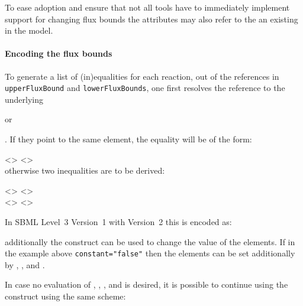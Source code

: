\begin{newsection}
\begin{deprecated}
{
To ease adoption and ensure that not all tools have to immediately implement
support for changing flux bounds the attributes may also refer to the an existing
\FluxBound in the model.
}
\end{deprecated}

\paragraph{Encoding the flux bounds}
To generate a list of (in)equalities for each reaction, out of the references
in \texttt{upperFluxBound} and \texttt{lowerFluxBounds}, one first resolves the
reference to the underlying \Parameter
\begin{deprecated}
or \FluxBound
\end{deprecated}. If they point to the same element, the equality will be of the form:

<> \token{=} <>\\

otherwise two inequalities are to be derived:

<> \token{>=} <>\\
<> \token{<=} <>

In SBML Level~3 Version~1 with \FBC Version~2 this is encoded as:
%

additionally the \InitialAssignment construct can be used to change the value of the
\Parameter elements. If in the example above \texttt{constant="false"} then the elements
can be set additionally by  \EventAssignment, \AssignmentRule, and \AlgebraicRule.


\begin{deprecated}

In case no evaluation of \InitialAssignment, \EventAssignment, \AssignmentRule,
and \AlgebraicRule is desired, it is possible to continue using the \FluxBound
construct using the same scheme:


\end{deprecated}

%


%

%


\end{newsection}
